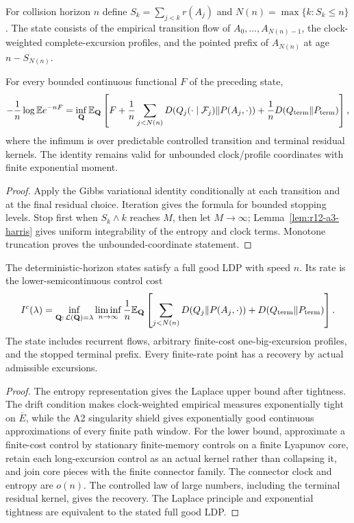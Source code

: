 For collision horizon $n$ define $S_k=\sum_{j<k}r(A_j)$ and
$N(n)=\max\{k:S_k\le n\}$.  The state consists of the empirical transition
flow of $A_0,\ldots,A_{N(n)-1}$, the clock-weighted complete-excursion
profiles, and the pointed prefix of $A_{N(n)}$ at age $n-S_{N(n)}$.

\begin{theorem}
\label{thm:r12-a3-control}
For every bounded continuous functional $F$ of the preceding state,
\[
 -{1\over n}\log\mathbb E e^{-nF}
 =\inf_{\mathbf Q}
 \mathbb E_{\mathbf Q}\left[
 F+{1\over n}\sum_{j<N(n)}
 D(Q_j(\cdot\mid\mathcal F_j)\Vert P(A_j,\cdot))
 +{1\over n}D(Q_{\rm term}\Vert P_{\rm term})
 \right],
\]
where the infimum is over predictable controlled transition and terminal
residual kernels.  The identity remains valid for unbounded clock/profile
coordinates with finite exponential moment.
\end{theorem}

\begin{proof}
Apply the Gibbs variational identity conditionally at each transition and at
the final residual choice.  Iteration gives the formula for bounded stopping
levels.  Stop first when $S_k\wedge k$ reaches $M$, then let $M\to\infty$;
Lemma~\ref{lem:r12-a3-harris} gives uniform integrability of the entropy and
clock terms.  Monotone truncation proves the unbounded-coordinate statement.
\end{proof}

\begin{theorem}
\label{thm:r12-a3-collision}
The deterministic-horizon states satisfy a full good LDP with speed $n$.  Its
rate is the lower-semicontinuous control cost
\[
 I^c(\lambda)=
 \inf_{\mathbf Q:\,\mathcal L(\mathbf Q)=\lambda}
 \liminf_{n\to\infty}{1\over n}
 \mathbb E_{\mathbf Q}
 \left[\sum_{j<N(n)}D(Q_j\Vert P(A_j,\cdot))
       +D(Q_{\rm term}\Vert P_{\rm term})\right].
\]
The state includes recurrent flows, arbitrary finite-cost one-big-excursion
profiles, and the stopped terminal prefix.  Every finite-rate point has a
recovery by actual admissible excursions.
\end{theorem}

\begin{proof}
The entropy representation gives the Laplace upper bound after tightness.
The drift condition makes clock-weighted empirical measures exponentially
tight on $\overline E$, while the A2 singularity shield gives exponentially
good continuous approximations of every finite path window.  For the lower
bound, approximate a finite-cost control by stationary finite-memory controls
on a finite Lyapunov core, retain each long-excursion control as an actual
kernel rather than collapsing it, and join core pieces with the finite
connector family.  The connector clock and entropy are $o(n)$.  The controlled
law of large numbers, including the terminal residual kernel, gives the
recovery.  The Laplace principle and exponential tightness are equivalent to
the stated full good LDP.
\end{proof}

